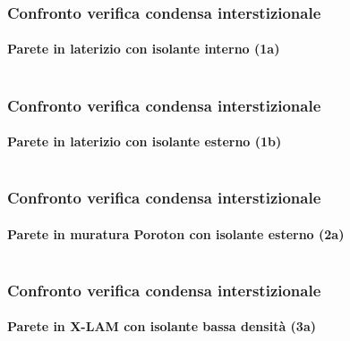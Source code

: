 \documentclass[aspectratio=141,10pt]{beamer}
\begin{document}
\begin{frame}
    \frametitle{Confronto verifica condensa interstizionale}
    \framesubtitle{Parete in laterizio con isolante interno (1a)}
    \begin{columns}
        \begin{column}{0.45\textwidth}
            \resizebox{\textwidth}{!}{%
            
            }
        \end{column}
        \begin{column}{0.55\textwidth}
            \scriptsize
            
        \end{column}
    \end{columns}
\end{frame}
\begin{frame}
    \frametitle{Confronto verifica condensa interstizionale}
    \framesubtitle{Parete in laterizio con isolante esterno (1b)}
    \begin{columns}
        \begin{column}{0.45\textwidth}
            \resizebox{\textwidth}{!}{%
            
            }
        \end{column}
        \begin{column}{0.55\textwidth}
            \scriptsize
            
        \end{column}
    \end{columns}
\end{frame}
\begin{frame}
    \frametitle{Confronto verifica condensa interstizionale}
    \framesubtitle{Parete in muratura Poroton con isolante esterno (2a)}
    \begin{columns}
        \begin{column}{0.45\textwidth}
            \resizebox{\textwidth}{!}{%
            
            }
        \end{column}
        \begin{column}{0.55\textwidth}
            \scriptsize
            
        \end{column}
    \end{columns}
\end{frame}
\begin{frame}
    \frametitle{Confronto verifica condensa interstizionale}
    \framesubtitle{Parete in X-LAM con isolante bassa densità (3a)}
    \begin{columns}
        \begin{column}{0.45\textwidth}
            \resizebox{\textwidth}{!}{%
            
            }
        \end{column}
        \begin{column}{0.55\textwidth}
            \scriptsize
            
        \end{column}
    \end{columns}
\end{frame}
\end{document}
